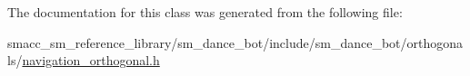 The documentation for this class was generated from the following file\+:\begin{DoxyCompactItemize}
\item 
smacc\+\_\+sm\+\_\+reference\+\_\+library/sm\+\_\+dance\+\_\+bot/include/sm\+\_\+dance\+\_\+bot/orthogonals/\hyperlink{smacc__sm__reference__library_2sm__dance__bot_2include_2sm__dance__bot_2orthogonals_2navigation__orthogonal_8h}{navigation\+\_\+orthogonal.\+h}\end{DoxyCompactItemize}
